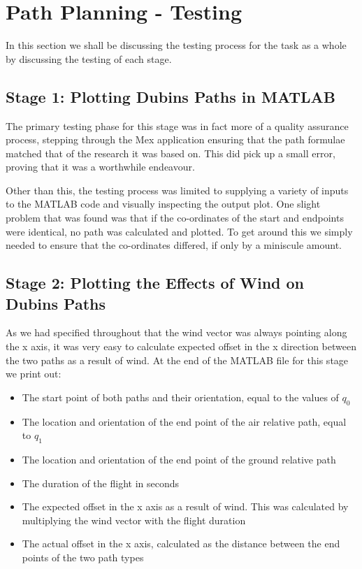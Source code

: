 \section{Path Planning - Testing}
\label{task1:testing}

In this section we shall be discussing the testing process for the task as a whole by discussing the testing of each stage. 

\subsection{Stage 1: Plotting Dubins Paths in MATLAB}
\label{task1:testing:stage1}

The primary testing phase for this stage was in fact more of a quality assurance process, stepping through the Mex application ensuring that the path formulae matched that of the research it was based on. This did pick up a small error, proving that it was a worthwhile endeavour. 

Other than this, the testing process was limited to supplying a variety of inputs to the MATLAB code and visually inspecting the output plot. One slight problem that was found was that if the co-ordinates of the start and endpoints were identical, no path was calculated and plotted. To get around this we simply needed to ensure that the co-ordinates differed, if only by a miniscule amount. 

\subsection{Stage 2: Plotting the Effects of Wind on Dubins Paths}
\label{task1:testing:stage2}

As we had specified throughout that the wind vector was always pointing along the x axis, it was very easy to calculate expected offset in the x direction between the two paths as a result of wind. At the end of the MATLAB file for this stage we print out:

\begin{itemize}
	\item The start point of both paths and their orientation, equal to the values of $q_0$
	\item The location and orientation of the end point of the air relative path, equal to $q_1$
	\item The location and orientation of the end point of the ground relative path
	\item The duration of the flight in seconds
	\item The expected offset in the x axis as a result of wind. This was calculated by multiplying the wind vector with the flight duration
	\item The actual offset in the x axis, calculated as the distance between the end points of the two path types
\end{itemize}

